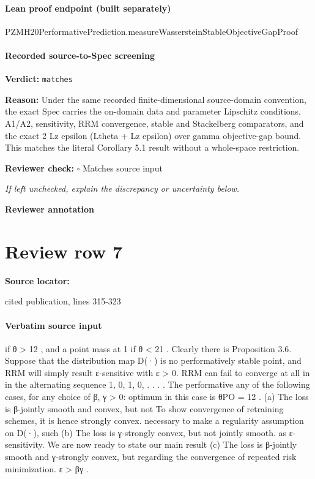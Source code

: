 \documentclass[10pt]{article}
\newcommand{\reviewerbox}{%
  \par\noindent\fbox{\parbox{0.96\linewidth}{\rule{0pt}{0.38in}}}\par
}
\newcommand{\reviewmatch}[1]{%
  \par\noindent\textbf{Reviewer check:} $\square$\; #1\par
  \noindent\emph{If left unchecked, explain the discrepancy or uncertainty below.}\par
}
\begin{document}
\paragraph{Lean proof endpoint (built separately)}\begin{ReviewVerbatim}
PZMH20PerformativePrediction.measureWassersteinStableObjectiveGapProof
\end{ReviewVerbatim}

\paragraph{Recorded source-to-Spec screening}
\textbf{Verdict:} \texttt{matches}
\\
{\raggedright
\textbf{Reason:} Under the same recorded finite-\allowbreak{}dimensional source-\allowbreak{}domain convention, the exact Spec carries the on-\allowbreak{}domain data and parameter Lipschitz conditions, A1/\allowbreak{}A2, sensitivity, RRM convergence, stable and Stackelberg comparators, and the exact 2 Lz epsilon (Ltheta + Lz epsilon) over gamma objective-\allowbreak{}gap bound.\allowbreak{} This matches the literal Corollary 5.\allowbreak{}1 result without a whole-\allowbreak{}space restriction.\allowbreak{}
\par}
\reviewmatch{Matches source input}
\noindent\textbf{Reviewer annotation}\par
\reviewerbox
\clearpage
\hypertarget{source-claim-1127efac5a38e232}{}
\section*{Review row 7}
\textbf{Source locator:} {\footnotesize\raggedright cited publication, lines 315-\allowbreak{}323\par}
\paragraph{Verbatim source input}
\begin{ReviewVerbatim}
if θ > 12 , and a point mass at 1 if θ < 21 . Clearly there is     Proposition 3.6. Suppose that the distribution map D(·) is
no performatively stable point, and RRM will simply result         ε-sensitive with ε > 0. RRM can fail to converge at all in
in the alternating sequence 1, 0, 1, 0, . . . . The performative   any of the following cases, for any choice of β, γ > 0:
optimum in this case is θPO = 12 .
                                                                    (a) The loss is β-jointly smooth and convex, but not
To show convergence of retraining schemes, it is hence                  strongly convex.
necessary to make a regularity assumption on D(·), such             (b) The loss is γ-strongly convex, but not jointly smooth.
as ε-sensitivity. We are now ready to state our main result         (c) The loss is β-jointly smooth and γ-strongly convex, but
regarding the convergence of repeated risk minimization.                ε > βγ .
\end{ReviewVerbatim}
\end{document}
